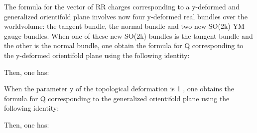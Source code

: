 \documentclass[a4paper,a4paper]{article}
\begin{document}
\begin{center}
{  \coordHE{} }
\end{center}
The formula for the vector of RR charges corresponding to a y-deformed and generalized orientifold plane involves now   four y-deformed real bundles over the worldvolume: the tangent bundle, the normal bundle and two new SO(2k) YM gauge bundles.
When one of these new SO(2k) bundles is the tangent bundle and the other is the normal bundle, one obtain the  formula for Q corresponding to the y-deformed orientifold plane using the following identity:
\begin{center}
 
{  \coordHE{}}
\end{center}
Then, one has:

\begin{center}
{  \coordHE{} }
\end{center}

\begin{center}
{  \coordHE{} }
\end{center}
When the parameter y of the topological deformation is 1 , one obtains the  formula for Q corresponding to the generalized orientifold plane using the following identity:
\begin{center}
 
{  \coordHE{}}
\end{center}
Then, one has:

\begin{center}
{  \coordHE{} }
\end{center}
\end{document}
